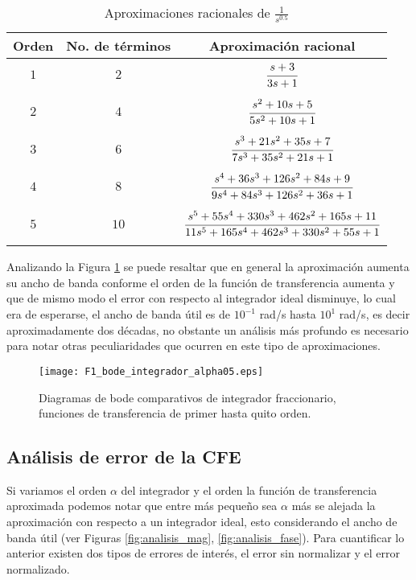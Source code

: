 	\begin{table}[!hbp]
		\caption{Aproximaciones racionales de $\frac{1}{s^{0.5}}$}
		\label{tab:aprox_cfe_alpha_0.5}
		\centering
		\begin{tabular}{c c c}
			\hline
			\textbf{Orden} &  \textbf{No. de términos} & \textbf{Aproximación racional}\\
			\hline
			$1$ 		& $2$ 		&  $\cfrac{s + 3}{3s + 1}$\\
					 		& 		 		& \\
			$2$			& $4$ 		&  $\cfrac{s^{2} + 10s + 5}{5 s^{2} + 10s + 1}$\\
							& 		 		& \\
			$3$ 		& $6$ 		&  $\cfrac{s^{3} + 21s^{2} + 35s + 7}{7 s^3 + 35 s^2 + 21 s + 1}$	\\
							& 		 		& \\
			$4$ 		& $8$ 		&  $\cfrac{s^4 + 36 s^3 + 126 s^2 + 84 s + 9}{9 s^4 + 84 s^3 + 126 s^2 + 36 s + 1}$\\
							& 		 		& \\
			$5$ 		& $10$ 		&  $\cfrac{s^5 + 55 s^4 + 330 s^3 + 462 s^2 + 165 s + 11}{11 s^5 + 165 s^4 + 462 s^3 + 330 s^2 + 55 s + 1}$\\
							& 		 		& \\
			\hline
		\end{tabular}
	\end{table}
	
	Analizando la Figura \ref{fig:F1_bode_integrador_alpha05} se puede resaltar que en general la aproximación aumenta su ancho de banda conforme el orden de la función de transferencia aumenta y que de mismo modo el error con respecto al integrador ideal disminuye, lo cual era de esperarse, el ancho de banda útil es de $10^{-1}$ rad/s hasta $10^{1}$ rad/s, es decir aproximadamente dos décadas, no obstante un análisis más profundo es necesario para notar otras peculiaridades que ocurren en este tipo de aproximaciones.
	
	\begin{figure}[hbtp]
	\caption{Diagramas de bode comparativos de integrador fraccionario, funciones de transferencia de primer hasta quito orden.} 
	\label{fig:F1_bode_integrador_alpha05}
	\centering
	\texttt{[image: F1\_bode\_integrador\_alpha05.eps]}
	\end{figure}
	
	\subsection{Análisis de error de la CFE}
	Si variamos el orden $\alpha$ del integrador y el orden la función de transferencia aproximada podemos notar que entre más pequeño sea $\alpha$ más se alejada la aproximación con respecto a un integrador ideal, esto considerando el ancho de banda útil (ver Figuras \ref{fig:analisis_mag}, \ref{fig:analisis_fase}). Para cuantificar lo anterior existen dos tipos de errores de interés, el error sin normalizar y el error normalizado.
	
